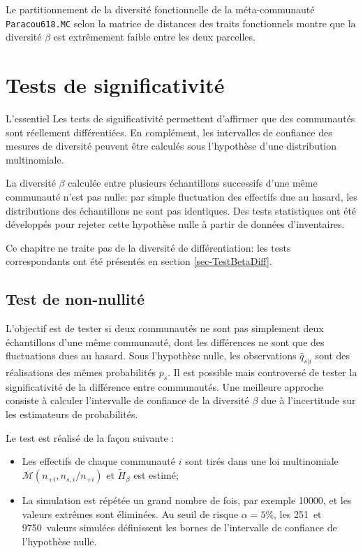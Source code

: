 \documentclass[
  11pt,
  french,
  a4paper,
  extrafontsizes,onecolumn,openright
  ]{memoir}
\providecommand{\tightlist}{%
  \setlength{\itemsep}{0pt}\setlength{\parskip}{0pt}}
\newenvironment{Summary}
  {\begin{bclogo}[logo=\bctrombone, noborder=true, couleur=lightgray!50]{L'essentiel}\parindent0pt}
  {\end{bclogo}}
\begin{document}
\normalsize

Le partitionnement de la diversité fonctionnelle de la méta-communauté \texttt{Paracou618.MC} selon la matrice de distances des traits fonctionnels montre que la diversité \(\beta\) est extrêmement faible entre les deux parcelles.

\chapter{Tests de significativité}\label{tests-de-significativituxe9}

\begin{Summary}
Les tests de significativité permettent d'affirmer que des communautés sont réellement différentiées. En complément, les intervalles de confiance des mesures de diversité peuvent être calculés sous l'hypothèse d'une distribution multinomiale.

\end{Summary}

La diversité \(\beta\) calculée entre plusieurs échantillons successifs d'une même communauté n'est pas nulle: par simple fluctuation des effectifs due au hasard, les distributions des échantillons ne sont pas identiques.
Des tests statistiques ont été développés pour rejeter cette hypothèse nulle à partir de données d'inventaires.

Ce chapitre ne traite pas de la diversité de différentiation: les tests correspondants ont été présentés en section \ref{sec-TestBetaDiff}.

\section{Test de non-nullité}\label{test-de-non-nullituxe9-1}

L'objectif est de tester si deux communautés ne sont pas simplement deux échantillons d'une même communauté, dont les différences ne sont que des fluctuations dues au hasard.
Sous l'hypothèse nulle, les observations \(\hat{q}_{s|i}\) sont des réalisations des mêmes probabilités \(p_s\).
Il est possible \autocite{Crist2003} mais controversé \autocite{Jones1986} de tester la significativité de la différence entre communautés.
Une meilleure approche consiste à calculer l'intervalle de confiance de la diversité \(\beta\) due à l'incertitude sur les estimateurs de probabilités.

Le test est réalisé de la façon suivante \autocite{Marcon2014a}:

\begin{itemize}
\tightlist
\item
  Les effectifs de chaque communauté \(i\) sont tirés dans une loi multinomiale \({\mathcal M}(n_{+i},{n_{s,i}}/{n_{+i}})\) et \({\tilde{H}}_{\beta}\) est estimé;
\item
  La simulation est répétée un grand nombre de fois, par exemple 10000, et les valeurs extrêmes sont éliminées. Au seuil de risque \(\alpha=5\%\), les 251\ieme~et 9750\ieme~valeurs simulées définissent les bornes de l'intervalle de confiance de l'hypothèse nulle.
\end{itemize}
\end{document}

